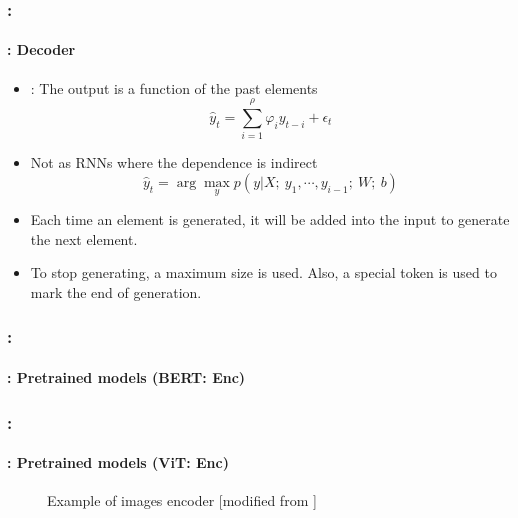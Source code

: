\documentclass[xcolor=table]{beamer}
\begin{document}
\begin{frame}
	\frametitle{\insertshortsubtitle: \insertsection}
	\framesubtitle{\insertsubsection: Decoder}
	
	\begin{itemize}
		\item {}: The output is a  function of the past elements
		\[\hat{y}_t = \sum_{i = 1}^{\rho} \varphi_{i} y_{t-i} + \epsilon_t\]
		\item Not as RNNs where the dependence is indirect
		\[\hat{y}_t = \arg\max_y p(y | X;\ y_1, \cdots, y_{i-1};\ W;\ b)\]
		\item Each time an element is generated, it will be added into the input to generate the next element.
		\item To stop generating, a maximum size is used. Also, a special token is used to mark the end of generation.
	\end{itemize}
	
\end{frame}

\begin{frame}
	\frametitle{\insertshortsubtitle: \insertsection}
	\framesubtitle{\insertsubsection: Pretrained models (BERT: Enc) \cite{devlin-etal-2019-bert}}

	\begin{center}
	\end{center}
	
\end{frame}

\begin{frame}
	\frametitle{\insertshortsubtitle: \insertsection}
	\framesubtitle{\insertsubsection: Pretrained models (ViT: Enc) \cite{dosovitskiy2021an}}
	
	
	\vspace{-6pt}
	\begin{figure}[htp!]
		\centering
		\vskip-8pt
		\caption{Example of images encoder [modified from \cite{zhang2021dive}]}
	\end{figure}
	
\end{frame}
\end{document}
